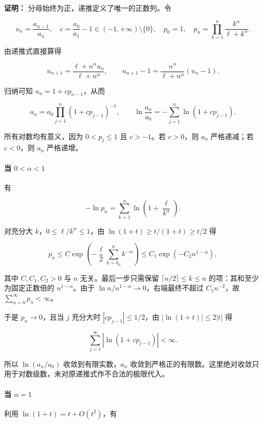 \documentclass[11pt,a4paper]{article}
\begin{document}
\textbf{证明：} 分母始终为正，递推定义了唯一的正数列。令

\[
u_n=\frac{a_{n-1}}{a_n},\quad
c=\frac{a_0}{a_1}-1\in(-1,+\infty)\setminus\{0\},\quad
p_0=1,\quad p_n=\prod_{k=1}^{n}\frac{k^\alpha}{\ell+k^\alpha}.
\]

由递推式直接算得

\[
u_{n+1}=\frac{\ell+n^\alpha u_n}{\ell+n^\alpha},
\qquad u_{n+1}-1=\frac{n^\alpha}{\ell+n^\alpha}(u_n-1).
\]

归纳可知 \(u_n=1+cp_{n-1}\)，从而

\[
a_n=a_0\prod_{j=1}^{n}(1+cp_{j-1})^{-1},\qquad
\ln\frac{a_n}{a_0}=-\sum_{j=1}^{n}\ln(1+cp_{j-1}).
\]

所有对数均有意义，因为 \(0<p_j\le1\) 且 \(c>-1\)。若 \(c>0\)，则 \(a_n\)
严格递减；若 \(c<0\)，则 \(a_n\) 严格递增。

\paragraph{\texorpdfstring{当
\(0<\alpha<1\)}{当 0\textless\textbackslash alpha\textless1}}\label{ux5f53-0alpha1}

有

\[
-\ln p_n=\sum_{k=1}^{n}\ln\left(1+\frac{\ell}{k^\alpha}\right).
\]

对充分大 \(k\)，\(0\le\ell/k^\alpha\le1\)，由
\(\ln(1+t)\ge t/(1+t)\ge t/2\) 得

\[
p_n\le C\exp\left(-\frac{\ell}{2}\sum_{k=k_0}^{n}k^{-\alpha}\right)
\le C_1\exp(-C_2 n^{1-\alpha}),
\]

其中 \(C,C_1,C_2>0\) 与 \(n\) 无关。最后一步只需保留
\(\lceil n/2\rceil\le k\le n\) 的项：其和至少为固定正数倍的
\(n^{1-\alpha}\)。由于 \(\ln n/n^{1-\alpha}\to0\)，右端最终不超过
\(C_1n^{-2}\)，故 \(\sum_{n=0}^{\infty}p_n<\infty\)。

于是 \(p_n\to0\)，且当 \(j\) 充分大时 \(|cp_{j-1}|\le1/2\)，由
\(|\ln(1+t)|\le2|t|\) 得

\[
\sum_{j=1}^{\infty}|\ln(1+cp_{j-1})|<\infty.
\]

所以 \(\ln(a_n/a_0)\) 收敛到有限实数，\(a_n\)
收敛到严格正的有限数。这里绝对收敛只用于对数级数，未对原递推式作不合法的极限代入。

\paragraph{\texorpdfstring{当
\(\alpha=1\)}{当 \textbackslash alpha=1}}\label{ux5f53-alpha1}

利用 \(\ln(1+t)=t+O(t^2)\)，有
\end{document}

